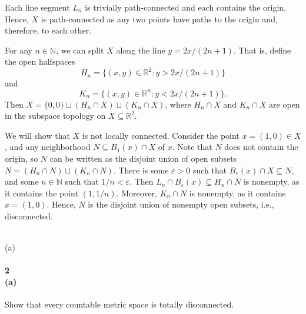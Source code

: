 \documentclass[12pt]{article}
\newlength{\myparskip}
\newenvironment{fullbox}{\begin{lrbox}{\savefullbox}\begin{minipage}{\dimexpr\textwidth-2\fboxsep\relax}\setlength{\parskip}{\myparskip}}{\end{minipage}\end{lrbox}\framebox[\textwidth]{\usebox{\savefullbox}}}
\newenvironment{pbox}[1][]{\begin{fullbox}\ifx#1\empty\else\paragraph{#1}\fi}{\end{fullbox}}
\newcommand{\N}{\mathbb{N}}
\newcommand{\R}{\mathbb{R}}
\newcommand{\eps}{\varepsilon}
\newcommand{\<}{\langle}
\renewcommand{\>}{\rangle}
\begin{document}
Each line segment $L_n$ is trivially path-connected and each contains the origin. Hence, $X$ is path-connected as any two points have paths to the origin and, therefore, to each other.

For any $n \in \N$, we can split $X$ along the line $y = 2x/(2n + 1)$. That is, define the open halfspaces
\[
    H_n = \{(x, y) \in \R^2 : y > 2x/(2n + 1)\}
\]
and
\[
    K_n = \{(x, y) \in \R^n : y < 2x/(2n + 1)\}.
\]
Then $X = \{0, 0\} \sqcup (H_n \cap X) \sqcup (K_n \cap X)$, where $H_n \cap X$ and $K_n \cap X$ are open in the subspace topology on $X \subseteq \R^2$.

We will show that $X$ is not locally connected. Consider the point $x = (1, 0) \in X$, and any neighborhood $N \subseteq B_1(x) \cap X$ of $x$. Note that $N$ does not contain the origin, so $N$ can be written as the disjoint union of open subsets $N = (H_n \cap N) \sqcup (K_n \cap N)$. There is some $\eps > 0$ such that $B_\eps(x) \cap X \subseteq N$, and some $n \in \N$ such that $1/n < \eps$. Then $L_n \cap B_\eps(x) \subseteq H_n \cap N$ is nonempty, as it contains the point $(1, 1/n)$. Moreover, $K_n \cap N$ is nonempty, as it contains $x = (1, 0)$. Hence, $N$ is the disjoint union of nonempty open subsets, i.e., disconnected.



\newpage
\begin{pbox}[2 \\ (a)]
    Show that every countable metric space is totally disconnected.
\end{pbox}
\end{document}
